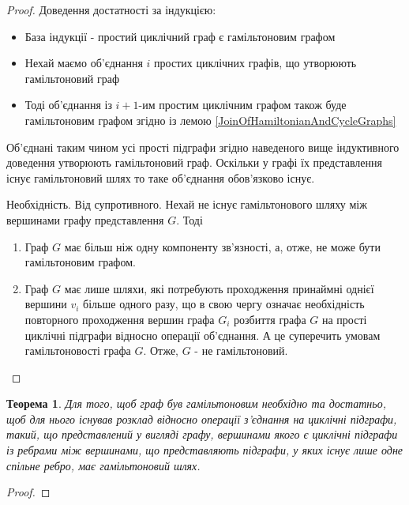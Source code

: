 \documentclass[a4paper,14pt,ukrainian]{extarticle}
\newtheorem{theorem}{Теорема}
\begin{document}
    \begin{proof}
        Доведення достатності за індукцією:
        \begin{itemize}
            \item База індукції - простий циклічний граф є гамільтоновим графом
            \item Нехай маємо об’єднання $i$ простих циклічних графів, що утворюють гамільтоновий граф
            \item Тоді об’єднання із $i+1$-им простим циклічним графом також буде гамільтоновим графом згідно із лемою \ref{JoinOfHamiltonianAndCycleGraphs}
        \end{itemize}
        Об’єднані таким чином усі прості підграфи згідно наведеного вище індуктивного доведення утворюють гамільтоновий граф.
        Оскільки у графі їх представлення існує гамільтоновий шлях то таке об’єднання обов’язково існує.
        
        Необхідність.
        Від супротивного.
        Нехай не існує гамільтонового шляху між вершинами графу представлення $G$.
        Тоді 
        \begin{enumerate}
        \item Граф $G$ має більш ніж одну компоненту зв’язності, а, отже, не може бути гамільтоновим графом.
        \item Граф $G$ має лише шляхи, які потребують проходження принаймні однієї вершини $v_i$ більше одного разу, що в свою чергу означає необхідність повторного проходження вершин графа $G_i$ розбиття графа $G$ на прості циклічні підграфи відносно операції об’єднання. А це суперечить умовам гамільтоновості графа $G$. Отже, $G$ - не гамільтоновий.
        \end{enumerate}
    \end{proof}
    \begin{theorem}
        Для того, щоб граф був гамільтоновим необхідно та достатньо, щоб для нього існував розклад відносно операції з’єднання на циклічні підграфи, такий, що представлений у вигляді графу, вершинами якого є циклічні підграфи із ребрами між вершинами, що представляють підграфи, у яких існує лише одне спільне ребро, має гамільтоновий шлях.
    \end{theorem}
    \begin{proof}
    \end{proof}
\end{document}
